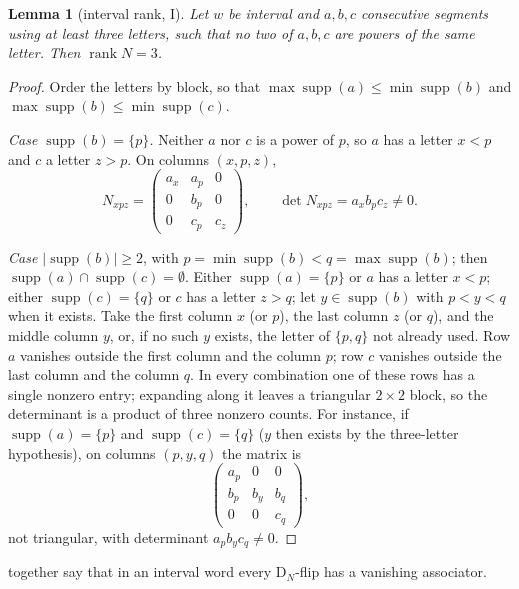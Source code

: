 \documentclass[11pt,a4paper]{article}
\newtheorem{lemma}[thm]{Lemma}
\theoremstyle{definition}
\theoremstyle{remark}
\newcommand{\DN}{\mathrm{D}_N}
\DeclareMathOperator{\rank}{rank}
\DeclareMathOperator{\supp}{supp}
\begin{document}
\begin{lemma}[interval rank, I]\label{lem:I}
Let $w$ be interval and $a,b,c$ consecutive segments using at least three letters, such that no two of
$a,b,c$ are powers of the same letter. Then $\rank N=3$.
\end{lemma}
\begin{proof}
Order the letters by block, so that $\max\supp(a)\le\min\supp(b)$ and $\max\supp(b)\le\min\supp(c)$.

\emph{Case $\supp(b)=\{p\}$.} Neither $a$ nor $c$ is a power of $p$, so $a$ has a letter $x<p$ and $c$ a
letter $z>p$. On columns $(x,p,z)$,
\[
  N_{xpz}=\begin{pmatrix}a_x&a_p&0\\0&b_p&0\\0&c_p&c_z\end{pmatrix},\qquad \det N_{xpz}=a_xb_pc_z\ne0.
\]

\emph{Case $\lvert\supp(b)\rvert\ge2$}, with $p=\min\supp(b)<q=\max\supp(b)$; then
$\supp(a)\cap\supp(c)=\emptyset$. Either $\supp(a)=\{p\}$ or $a$ has a letter $x<p$; either
$\supp(c)=\{q\}$ or $c$ has a letter $z>q$; let $y\in\supp(b)$ with $p<y<q$ when it exists. Take the first
column $x$ (or $p$), the last column $z$ (or $q$), and the middle column $y$, or, if no such $y$ exists,
the letter of $\{p,q\}$ not already used. Row $a$ vanishes outside the first column and the column $p$;
row $c$ vanishes outside the last column and the column $q$. In every combination one of these rows has a
single nonzero entry; expanding along it leaves a triangular $2\times2$ block, so the determinant is a
product of three nonzero counts. For instance, if $\supp(a)=\{p\}$ and $\supp(c)=\{q\}$ ($y$ then exists
by the three-letter hypothesis), on columns $(p,y,q)$ the matrix is
\[
  \begin{pmatrix}a_p&0&0\\b_p&b_y&b_q\\0&0&c_q\end{pmatrix},
\]
not triangular, with determinant $a_pb_yc_q\ne0$.
\end{proof}

 together say that in an interval word every $\DN$-flip has a vanishing associator.
\end{document}
